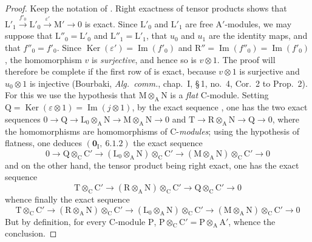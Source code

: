 \begin{proof}
Keep the notation of . Right exactness of tensor
products shows that $\mathrm{L}'_1\xrightarrow{f'_0}\mathrm{L}'_0
\xrightarrow{\varepsilon'}\mathrm{M}'\longrightarrow0$
is exact. Since $\mathrm{L}'_0$ and $\mathrm{L}'_1$ are free
$\mathrm{A}'$-modules, we may suppose that
$\mathrm{L}''_0=\mathrm{L}'_0$ and
$\mathrm{L}''_1=\mathrm{L}'_1$, that $u_0$ and $u_1$ are the identity
maps, and that $f''_0=f'_0$. Since
$\operatorname{Ker}(\varepsilon')=\operatorname{Im}(f'_0)$ and
$\mathrm{R}''=\operatorname{Im}(f''_0)=\operatorname{Im}(f'_0)$, the
homomorphism $v$ is \emph{surjective}, and hence so is $v\otimes1$. The proof
will therefore be complete if the first row of
 is exact, because $v\otimes1$ is
surjective and $u_0\otimes1$ is injective (Bourbaki,
\emph{Alg.\ comm.}, chap.~I, \S\,1, no.~4, Cor.~2 to Prop.~2). For this
we use
the hypothesis that $\mathrm{M}\otimes_\mathrm{A}\mathrm{N}$ is a \emph{flat} C-module. Setting $\mathrm{Q}=\operatorname{Ker}(\varepsilon\otimes 1)=\operatorname{Im}(j\otimes 1)$, by the exact sequence , one has the two exact sequences $0\to\mathrm{Q}\to\mathrm{L}_0\otimes_\mathrm{A}\mathrm{N}\to\mathrm{M}\otimes_\mathrm{A}\mathrm{N}\to 0$ and $\mathrm{T}\to\mathrm{R}\otimes_\mathrm{A}\mathrm{N}\to\mathrm{Q}\to 0$, where the homomorphisms are homomorphisms of C-\emph{modules}; using the hypothesis of flatness, one deduces $(\mathbf{0}_\mathrm{I},~6.1.2)$ the exact sequence
\[
  0\to\mathrm{Q}\otimes_\mathrm{C}\mathrm{C}'\to(\mathrm{L}_0\otimes_\mathrm{A}\mathrm{N})\otimes_\mathrm{C}\mathrm{C}'\to(\mathrm{M}\otimes_\mathrm{A}\mathrm{N})\otimes_\mathrm{C}\mathrm{C}'\to 0
\]
and on the other hand, the tensor product being right exact, one has the exact sequence
\[
  \mathrm{T}\otimes_\mathrm{C}\mathrm{C}'\to(\mathrm{R}\otimes_\mathrm{A}\mathrm{N})\otimes_\mathrm{C}\mathrm{C}'\to\mathrm{Q}\otimes_\mathrm{C}\mathrm{C}'\to 0
\]
whence finally the exact sequence
\[
  \mathrm{T}\otimes_\mathrm{C}\mathrm{C}'\to(\mathrm{R}\otimes_\mathrm{A}\mathrm{N})\otimes_\mathrm{C}\mathrm{C}'\to(\mathrm{L}_0\otimes_\mathrm{A}\mathrm{N})\otimes_\mathrm{C}\mathrm{C}'\to(\mathrm{M}\otimes_\mathrm{A}\mathrm{N})\otimes_\mathrm{C}\mathrm{C}'\to 0
\]
But by definition, for every C-module $\mathrm{P}$, $\mathrm{P}\otimes_\mathrm{C}\mathrm{C}'=\mathrm{P}\otimes_\mathrm{A}\mathrm{A}'$, whence the conclusion.
\end{proof}

